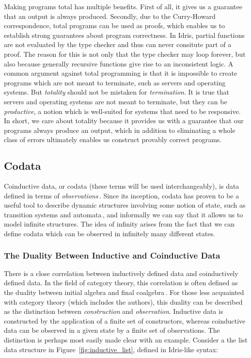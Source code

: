 Making programs total has multiple benefits. First of all, it gives us a guarantee that an output is always produced. Secondly, due to the Curry-Howard correspondence, total programs can be used as proofs, which enables us to establish strong guarantees about program correctness. In Idris, partial functions are not evaluated by the type checker and thus can never consitute part of a proof. The reason for this is not only that the type checker may loop forever, but also because generally recursive functions give rise to an inconsistent logic. A common argument against total programming is that it is impossible to create programs which are not meant to terminate, such as servers and operating systems. But \emph{totality} should not be mistaken for \emph{termination}. It is true that servers and operating systems are not meant to terminate, but they can be \emph{productive}, a notion which is well-suited for systems that need to be responsive. In short, we care about totality because it provides us with a guarantee that our programs always produce an output, which in addition to eliminating a whole class of errors ultimately enables us construct provably correct programs.


\subsection{Codata}
\label{sec:codata}
Coinductive data, or codata (these terms will be used interchangeably), is data defined in terms of \emph{observations}\,\citep{Jacobs97atutorial}. Since its inception, codata has proven to be a useful tool to describe dynamic structures involving some notion of state, such as transition systems and automata\,\citep{Jacobs97atutorial}, and informally we can say that it allows us to model infinite structures. The idea of infinity arises from the fact that we can define codata which can be observed in infinitely many different states.

\subsubsection{The Duality Between Inductive and Coinductive Data} There is a close correlation between inductively defined data and coinductively defined data. In the field of category theory, this correlation is often defined as the duality between initial algebra and final coalgebra\,\citep{Jacobs97atutorial}. For those less acquainted with category theory (which includes the authors), this duality can be described as the distinction between \emph{construction} and \emph{observation}. Inductive data is constructed by the application of a finite set of constructors, whereas coinductive data can be observed in a given state by a finite set of observations. The distinction is perhaps most easily made clear with an example. Consider a the list data structure in Figure~\ref{fig:inductive_list}, defined in Idris-like syntax:

